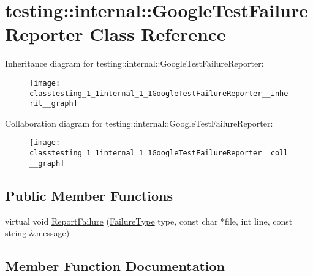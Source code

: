 \hypertarget{classtesting_1_1internal_1_1GoogleTestFailureReporter}{}\section{testing\+:\+:internal\+:\+:Google\+Test\+Failure\+Reporter Class Reference}
\label{classtesting_1_1internal_1_1GoogleTestFailureReporter}


Inheritance diagram for testing\+:\+:internal\+:\+:Google\+Test\+Failure\+Reporter\+:
\nopagebreak
\begin{figure}[H]
\begin{center}
\leavevmode
\texttt{[image: classtesting\_1\_1internal\_1\_1GoogleTestFailureReporter\_\_inherit\_\_graph]}
\end{center}
\end{figure}


Collaboration diagram for testing\+:\+:internal\+:\+:Google\+Test\+Failure\+Reporter\+:
\nopagebreak
\begin{figure}[H]
\begin{center}
\leavevmode
\texttt{[image: classtesting\_1\_1internal\_1\_1GoogleTestFailureReporter\_\_coll\_\_graph]}
\end{center}
\end{figure}
\subsection*{Public Member Functions}
\begin{DoxyCompactItemize}
\item 
virtual void \hyperlink{classtesting_1_1internal_1_1GoogleTestFailureReporter_a9b2f81e6c5b6e9f618fd75cc3e27e94c}{Report\+Failure} (\hyperlink{gtest__environment__test_8cc_aa43ad7e2c1c5c5150ba8d95607a96263}{Failure\+Type} type, const char $\ast$file, int line, const \hyperlink{namespacetesting_1_1internal_a8e8ff5b11e64078831112677156cb111}{string} \&message)
\end{DoxyCompactItemize}


\subsection{Member Function Documentation}

